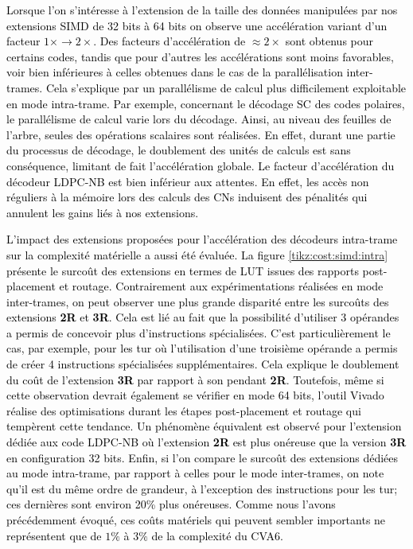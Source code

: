 \documentclass[../main.tex]{subfiles}
\begin{document}
\textcolor{black}{Lorsque l'on s'intéresse à l'extension de la taille des données manipulées par nos extensions SIMD de 32 bits à 64 bits on observe une accélération variant d'un facteur $1\times \rightarrow 2\times$. 
Des facteurs d'accélération de $\approx 2\times$ sont obtenus pour certains codes, tandis que pour d'autres les accélérations sont moins favorables, voir bien inférieures à celles obtenues dans le cas de la parallélisation inter-trames.
Cela s'explique par un parallélisme de calcul plus difficilement exploitable en mode intra-trame.
Par exemple, concernant le décodage SC des codes polaires, le parallélisme de calcul varie lors du décodage.
Ainsi, au niveau des feuilles de l'arbre, seules des opérations scalaires sont réalisées.
En effet, durant une partie du processus de décodage, le doublement des unités de calculs est sans conséquence, limitant de fait l'accélération globale.
Le facteur d'accélération du décodeur LDPC-NB est bien inférieur aux attentes.
En effet, les accès non réguliers à la mémoire lors des calculs des CNs induisent des pénalités qui annulent les gains liés à nos extensions.}

\textcolor{black}{L'impact des extensions proposées pour l'accélération des décodeurs intra-trame sur la complexité matérielle a aussi été évaluée.
La figure \ref{tikz:cost:simd:intra} présente le surcoût des extensions en termes de LUT issues des rapports post-placement et routage.
Contrairement aux expérimentations réalisées en mode inter-trames, on peut observer une plus grande disparité entre les surcoûts des extensions \textbf{2R} et \textbf{3R}. 
Cela est lié au fait que la possibilité d'utiliser $3$ opérandes a permis de concevoir plus d'instructions spécialisées. 
C'est particulièrement le cas, par exemple, pour les \acrlong{tur} où l'utilisation d'une troisième opérande a permis de créer 4 instructions spécialisées supplémentaires.
Cela explique le doublement du coût de l'extension \textbf{3R} par rapport à son pendant \textbf{2R}.
Toutefois, même si cette observation devrait également se vérifier en mode 64 bits, l'outil Vivado réalise des optimisations durant les étapes post-placement et routage qui tempèrent cette tendance.
Un phénomène équivalent est observé pour l'extension dédiée aux code LDPC-NB où l'extension \textbf{2R} est plus onéreuse que la version \textbf{3R} en configuration 32 bits.
Enfin, si l'on compare le surcoût des extensions dédiées au mode intra-trame, par rapport à celles pour le mode inter-trames, on note qu'il est du même ordre de grandeur, à l'exception des instructions pour les \acrlong{tur}; ces dernières sont environ 20\% plus onéreuses. 
Comme nous l'avons précédemment évoqué, ces coûts matériels qui peuvent sembler importants ne représentent que de $1\%$ à $3\%$ de la complexité du CVA6.}
\end{document}
